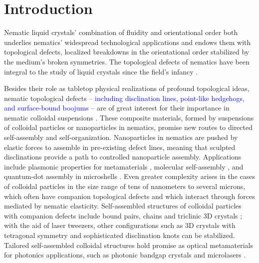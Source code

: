 \documentclass[utf8]{frontiersFPHY} %
\newcommand{\DAB}[1]{\textcolor{blue}{#1}}
\begin{document}
\section{Introduction}

Nematic liquid crystals' combination of fluidity and orientational order   both underlies nematics' widespread technological applications and endows them with topological defects, localized breakdowns in the orientational order stabilized by the medium's broken symmetries. The topological defects of nematics have been integral to the study of liquid crystals since the field's infancy \cite{Friedel1922}. %
%
%

Besides their role as tabletop physical realizations of profound topological ideas, nematic topological defects \DAB{-- including disclination lines, point-like hedgehogs, and surface-bound boojums --} are of great interest for their importance in nematic colloidal suspensions  \cite{poulin1997novel}.
%
 These composite materials, formed by suspensions of colloidal particles or nanoparticles in nematics, promise new routes to directed self-assembly and self-organization. Nanoparticles in nematics are pushed by elastic forces to assemble in pre-existing defect lines, meaning that sculpted disclinations provide a path to controlled nanoparticle assembly.  Applications include  plasmonic properties for metamaterials  \citep{dickson2008electronically,liu2010self}, molecular self-assembly  \cite{wang2016topological}, and quantum-dot assembly in microshells \cite{rodarte2013quantum,rodarte2015quantum}.  Even greater complexity arises in the cases of colloidal particles in the size range of tens of nanometers to several microns, which often have companion topological defects and which interact through forces mediated by nematic elasticity. Self-assembled structures of colloidal particles with companion defects include bound pairs, chains \citep{poulin1997novel,Musevic2006} and triclinic 3D crystals \citep{mundoor2016triclinic};  with the aid of laser tweezers, other configurations such as  3D crystals with tetragonal symmetry \cite{nych2013assembly} and sophisticated disclination knots   \citep{Ravnik2007,Tkalec:2011lj,tasinkevych2014splitting,machon2014knotted} can be stabilized. Tailored self-assembled colloidal structures hold promise as optical metamaterials for photonics applications, such as photonic bandgap crystals and microlasers \citep{Ravnik2011,lavrentovich2011liquid,humar20103d,muvsevivc2019interactions}. 
 
\end{document}

